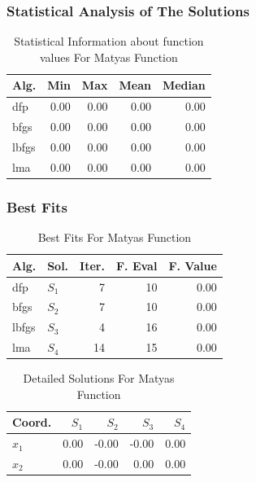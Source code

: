 \documentclass[conference]{IEEEtran}
\begin{document}
\subsubsection{Statistical Analysis of The Solutions}
\label{statisticalanalysismatyas2D}

\begin{table}[H]
\centering
\caption{Statistical Information about function values For Matyas Function}
\label{function_values:matyas}
\begin{tabular}{lrrrr}
\toprule
 Alg. &  Min &  Max &  Mean &  Median \\
\midrule
  dfp & 0.00 & 0.00 &  0.00 &    0.00 \\
 bfgs & 0.00 & 0.00 &  0.00 &    0.00 \\
lbfgs & 0.00 & 0.00 &  0.00 &    0.00 \\
  lma & 0.00 & 0.00 &  0.00 &    0.00 \\
\bottomrule
\end{tabular}
\end{table}

\subsubsection{Best Fits}
\label{bestfitsmatyas2D}

\begin{table}[H]
\centering
\caption{Best Fits For Matyas Function}
\label{solutions:matyas}
\begin{tabular}{llrrr}
\toprule
 Alg. &    Sol. &  Iter. &  F. Eval &  F. Value \\
\midrule
  dfp & $S_{1}$ &      7 &       10 &      0.00 \\
 bfgs & $S_{2}$ &      7 &       10 &      0.00 \\
lbfgs & $S_{3}$ &      4 &       16 &      0.00 \\
  lma & $S_{4}$ &     14 &       15 &      0.00 \\
\bottomrule
\end{tabular}
\end{table}

\begin{table}[H]
\centering
\caption{Detailed Solutions For Matyas Function}
\label{detailedsolutions:matyas}
\begin{tabular}{lrrrr}
\toprule
 Coord. &  $S_{1}$ &  $S_{2}$ &  $S_{3}$ &  $S_{4}$ \\
\midrule
$x_{1}$ &     0.00 &    -0.00 &    -0.00 &     0.00 \\
$x_{2}$ &     0.00 &    -0.00 &     0.00 &     0.00 \\
\bottomrule
\end{tabular}
\end{table}
\end{document}
